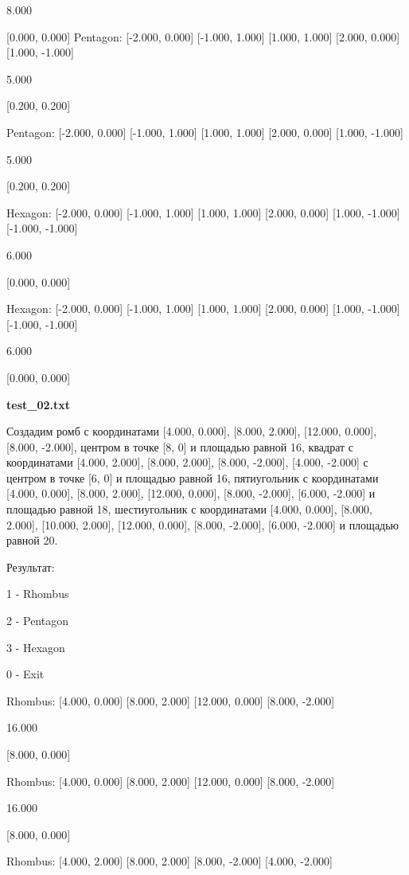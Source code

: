 \documentclass[a4paper, 12pt]{article}
\begin{document}
8.000

[0.000, 0.000]
Pentagon: [-2.000, 0.000] [-1.000, 1.000] [1.000, 1.000] [2.000, 0.000] [1.000, -1.000] 

5.000

[0.200, 0.200]

Pentagon: [-2.000, 0.000] [-1.000, 1.000] [1.000, 1.000] [2.000, 0.000] [1.000, -1.000] 

5.000

[0.200, 0.200]

Hexagon: [-2.000, 0.000] [-1.000, 1.000] [1.000, 1.000] [2.000, 0.000] [1.000, -1.000] [-1.000, -1.000] 

6.000

[0.000, 0.000]

Hexagon: [-2.000, 0.000] [-1.000, 1.000] [1.000, 1.000] [2.000, 0.000] [1.000, -1.000] [-1.000, -1.000] 

6.000

[0.000, 0.000]





\vspace{3ex}

\textbf{test\_02.txt} 

Создадим ромб с координатами [4.000, 0.000], [8.000, 2.000], [12.000, 0.000], [8.000, -2.000], центром в точке [8, 0] и площадью равной 16, квадрат с координатами [4.000, 2.000], [8.000, 2.000], [8.000, -2.000], [4.000, -2.000] с центром в точке [6, 0] и площадью равной 16, пятиугольник с координатами [4.000, 0.000], [8.000, 2.000], [12.000, 0.000], [8.000, -2.000], [6.000, -2.000] и площадью равной 18,  шестиугольник с координатами [4.000, 0.000], [8.000, 2.000], [10.000, 2.000], [12.000, 0.000], [8.000, -2.000], [6.000, -2.000] и площадью равной 20.

Результат:

1 - Rhombus

2 - Pentagon

3 - Hexagon

0 - Exit

Rhombus: [4.000, 0.000] [8.000, 2.000] [12.000, 0.000] [8.000, -2.000] 

16.000

[8.000, 0.000]

Rhombus: [4.000, 0.000] [8.000, 2.000] [12.000, 0.000] [8.000, -2.000] 

16.000

[8.000, 0.000]

Rhombus: [4.000, 2.000] [8.000, 2.000] [8.000, -2.000] [4.000, -2.000] 
\end{document}
